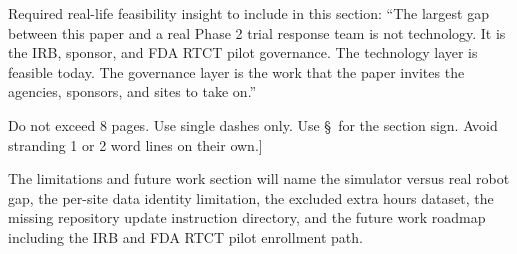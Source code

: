 \begin{sectionaccent}
Required real-life feasibility insight to include in this section:
``The largest gap between this paper and a real Phase 2 trial response
team is not technology. It is the IRB, sponsor, and FDA RTCT pilot
governance. The technology layer is feasible today. The governance
layer is the work that the paper invites the agencies, sponsors, and
sites to take on.''

Do not exceed 8 pages. Use single dashes only. Use \S\ for the
section sign. Avoid stranding 1 or 2 word lines on their own.]

The limitations and future work section will name the simulator
versus real robot gap, the per-site data identity limitation, the
excluded extra hours dataset, the missing repository update
instruction directory, and the future work roadmap including the IRB
and FDA RTCT pilot enrollment path.


\end{sectionaccent}
